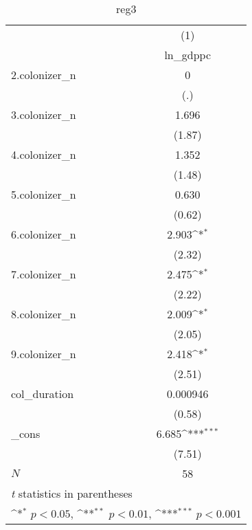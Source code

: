 \begin{table}[htbp]\centering
\def\sym#1{\ifmmode^{#1}\else\(^{#1}\)\fi}
\caption{reg3}
\begin{tabular}{l*{1}{c}}
\hline\hline
            &\multicolumn{1}{c}{(1)}\\
            &\multicolumn{1}{c}{ln\_gdppc}\\
\hline
2.colonizer\_n&           0         \\
            &         (.)         \\
[1em]
3.colonizer\_n&       1.696         \\
            &      (1.87)         \\
[1em]
4.colonizer\_n&       1.352         \\
            &      (1.48)         \\
[1em]
5.colonizer\_n&       0.630         \\
            &      (0.62)         \\
[1em]
6.colonizer\_n&       2.903\sym{*}  \\
            &      (2.32)         \\
[1em]
7.colonizer\_n&       2.475\sym{*}  \\
            &      (2.22)         \\
[1em]
8.colonizer\_n&       2.009\sym{*}  \\
            &      (2.05)         \\
[1em]
9.colonizer\_n&       2.418\sym{*}  \\
            &      (2.51)         \\
[1em]
col\_duration&    0.000946         \\
            &      (0.58)         \\
[1em]
\_cons      &       6.685\sym{***}\\
            &      (7.51)         \\
\hline
\(N\)       &          58         \\
\hline\hline
\multicolumn{2}{l}{\footnotesize \textit{t} statistics in parentheses}\\
\multicolumn{2}{l}{\footnotesize \sym{*} \(p<0.05\), \sym{**} \(p<0.01\), \sym{***} \(p<0.001\)}\\
\end{tabular}
\end{table}
